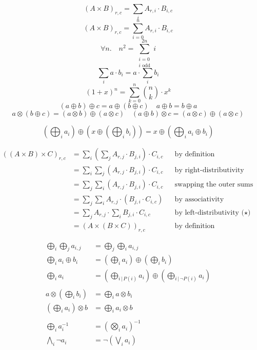 \documentclass{minimal}
\begin{document}
\[ (A \times B)_{r,c} = \sum_i A_{r,i} \cdot B_{i,c} \]
\[ (A \times B)_{r,c} = \sum_{i=0}^n A_{r,i} \cdot B_{i,c} \]
\[ \forall n.\quad n^2 = \sum_{\substack{i=0 \\ \text{\(i\) odd}}}^{2n} i \]
\[ \sum_i a \cdot b_i = a \cdot \sum_i b_i \]
\[ {(1 + x)}^n = \sum_{k=0}^n \binom{n}{k} \cdot x^k \]
\[ (a \oplus b) \oplus c = a \oplus (b \oplus c) \quad a \oplus b = b \oplus a \]
\[ a \otimes (b \oplus c) = (a \otimes b) \oplus (a \otimes c) \quad (a \oplus b) \otimes c = (a \otimes c) \oplus (a \otimes c) \]

\[ \left( \bigoplus_i a_i \right) \oplus \left( x \oplus \left( \bigoplus_i b_i \right) \right) = x \oplus \left( \bigoplus_i a_i \oplus b_i \right) \]

\begin{align*}
((A \times B) \times C)_{r,c}
&= \sum_i \left( \sum_j A_{r,j} \cdot B_{j,i} \right) \cdot C_{i,c}
    && \text{by definition} \\
&= \sum_i \sum_j (A_{r,j} \cdot B_{j,i}) \cdot C_{i,c}
    && \text{by right-distributivity (⋆)} \\
&= \sum_j \sum_i (A_{r,j} \cdot B_{j,i}) \cdot C_{i,c}
    && \text{swapping the outer sums (⋆)} \\
&= \sum_j \sum_i A_{r,j} \cdot (B_{j,i} \cdot C_{i,c})
    && \text{by associativity} \\
&= \sum_j A_{r,j} \cdot \sum_i B_{j,i} \cdot C_{i,c}
    && \text{by left-distributivity (⋆)} \\
&= (A \times (B \times C))_{r,c}
    && \text{by definition}
\end{align*}

\begin{align*}
\bigoplus_{i} \bigoplus_{j} a_{i,j} &= \bigoplus_{j} \bigoplus_{i} a_{i,j} \\
\bigoplus_{i} a_i \oplus b_i &= \left( \bigoplus_{i} a_i \right) \oplus \left( \bigoplus_{i} b_i \right) \\
\bigoplus_{i} a_i &= \left( \bigoplus_{i \,|\, P(i)} a_i \right) \oplus \left( \bigoplus_{i \,|\, \neg P(i)} a_i \right) \\ \\
a \otimes \left( \bigoplus_i b_i \right) &= \bigoplus_i a \otimes b_i \\
\left( \bigoplus_i a_i \right) \otimes b &= \bigoplus_i a_i \otimes b \\ \\
\bigoplus_i a_i^{-1} &= {\left( \bigotimes_i a_i \right)}^{-1} \\
\bigwedge_i \neg a_i &= \neg \left( \bigvee_i a_i \right)
\end{align*}
\end{document}
